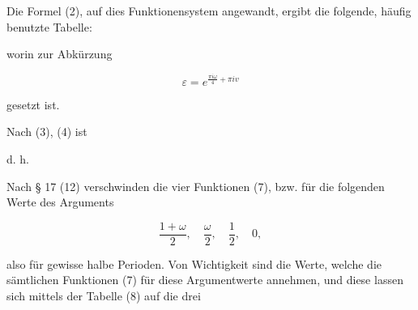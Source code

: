 
Die Formel (2), auf dies Funktionensystem angewandt, ergibt
die folgende, häufig benutzte Tabelle:


worin zur Abkürzung

\[
\varepsilon = e^{\frac{\pi i \omega}{4} + \pi i v}
\]

gesetzt ist.

Nach (3), (4) ist


d. h. 

Nach § 17 (12) verschwinden die vier Funktionen (7), bzw.
für die folgenden Werte des Arguments

\[
\frac{1+\omega}{2},\quad \frac{\omega}{2},\quad \frac{1}{2},\quad 0,
\]

also für gewisse halbe Perioden. Von Wichtigkeit sind die Werte,
welche die sämtlichen Funktionen (7) für diese Argumentwerte annehmen, und diese lassen sich mittels der Tabelle (8) auf die drei

